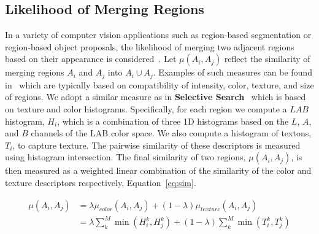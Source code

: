 \begin{appendices}




\section{Likelihood of Merging Regions}
\label{sec:app_cost}
In a variety of computer vision applications such as region-based segmentation or region-based object proposals, the likelihood of merging two adjacent regions based on their appearance is considered~\cite{Uijlings:etal:IJCV13}. Let $\mu(A_i,A_j)$ reflect the similarity of merging regions $A_i$ and $A_j$ into $A_i \cup A_j$. Examples of such measures can be found in~\cite{Uijlings:etal:IJCV13,Xiao:Lu:etal:CVPR15,Bonev:Yuille:ECCV14} which are typically based on compatibility of intensity, color, texture, and size of regions. We adopt a similar measure as in {\bf Selective Search}~\cite{Uijlings:etal:IJCV13} which is based on texture and color histograms. Specifically, for each region we compute a $LAB$ histogram, $H_i$, which is a combination of three 1D histograms based on the $L$, $A$, and $B$ channels of the LAB color space. We also compute a histogram of textons, $T_i$, to capture texture. The pairwise similarity of these descriptors is measured using histogram intersection. The final similarity of two regions, $\mu(A_i,A_j)$, is then measured as a weighted linear combination of the similarity of the color and texture descriptors respectively, Equation~\ref{eq:sim}.

\begin{equation}
\begin{split}
\mu(A_i,A_j) &= \lambda\mu_{color}(A_i,A_j)+(1-\lambda)\mu_{texture}(A_i,A_j) \\
             &= \lambda\sum_k^M\min(H_i^k,H_j^k)+ (1-\lambda)\sum_k^M\min(T_i^k,T_j^k)
\end{split}
\label{eq:sim}
\end{equation}


\end{appendices}
